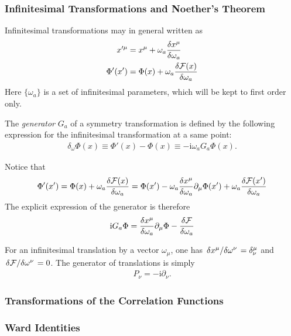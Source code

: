 \documentclass[10pt]{article}
\newcommand{\ii}{\mathrm{i}}
\begin{document}
\subsubsection{Infinitesimal Transformations and Noether's Theorem}
Infinitesimal transformations may in general written as 
\begin{align}
    x'^\mu&=x^\mu+\omega_a\fdv{x^\mu}{\omega_a}\\
    \Phi'(x')&=\Phi(x)+\omega_a \fdv{\mathcal{F}(x)}{\omega_a} 
\end{align}
Here $\{\omega_a\}$ is a set of infinitesimal parameters, which will be kept to first order only.
\begin{definition}\label{def:generator_of_a_symmetry_transformation}
    The \textit{generator} $G_a$ of a symmetry transformation is defined by the following expression for the infinitesimal transformation at a same point:
    \begin{align}
        \delta_\omega\Phi(x)\equiv\Phi'(x)-\Phi(x)\equiv-\ii\omega_a G_a\Phi(x).
    \end{align}
\end{definition}
Notice that 
\begin{align}
    \Phi'(x')=\Phi(x)+\omega_a \fdv{\mathcal{F}(x)}{\omega_a}=\Phi(x')-\omega_a\fdv{x^\mu}{\omega_a}\partial_\mu\Phi(x')+\omega_a\fdv{\mathcal{F}(x')}{\omega_a}
\end{align}
The explicit expression of the generator is therefore 
\begin{align}
    \ii G_a\Phi=\fdv{x^\mu}{\omega_a}\partial_\mu\Phi-\fdv{\mathcal{F}}{\omega_a}
\end{align}
\begin{example}
    For an infinitesimal translation by a vector $\omega_\mu$, one has $\fdv*{x^\mu}{\omega^\nu}=\delta^\mu_\nu$ and $\fdv*{\mathcal{F}}{\omega^\nu}=0$.
    The generator of translations is simply
    \begin{align}
        P_\nu=-\ii\partial_\nu.
    \end{align}
\end{example}
\subsubsection{Transformations of the Correlation Functions}
\subsubsection{Ward Identities}
\end{document}
